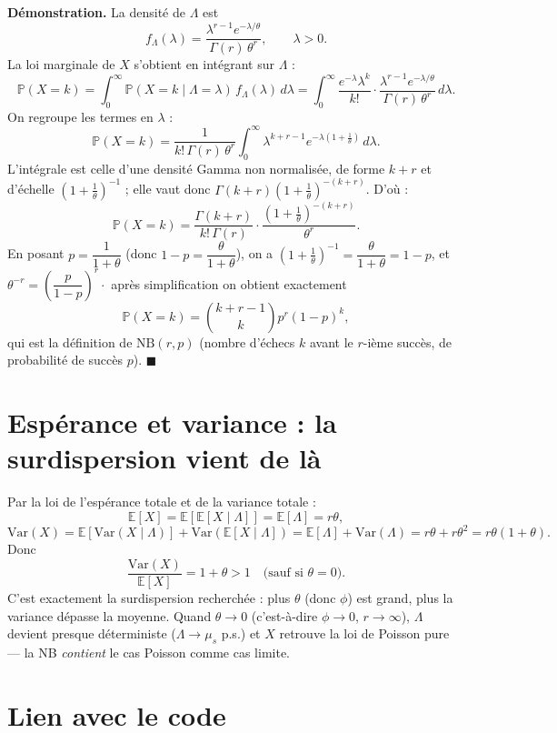 \documentclass[11pt]{article}
\begin{document}
\textbf{Démonstration.} La densité de $\Lambda$ est
\[
  f_\Lambda(\lambda) = \frac{\lambda^{r-1} e^{-\lambda/\theta}}{\Gamma(r)\,\theta^r}, \qquad \lambda > 0.
\]
La loi marginale de $X$ s'obtient en intégrant sur $\Lambda$ :
\[
  \mathbb{P}(X=k) = \int_0^\infty \mathbb{P}(X=k \mid \Lambda=\lambda)\, f_\Lambda(\lambda)\, d\lambda
  = \int_0^\infty \frac{e^{-\lambda}\lambda^k}{k!} \cdot \frac{\lambda^{r-1} e^{-\lambda/\theta}}{\Gamma(r)\,\theta^r}\, d\lambda .
\]
On regroupe les termes en $\lambda$ :
\[
  \mathbb{P}(X=k) = \frac{1}{k!\,\Gamma(r)\,\theta^r} \int_0^\infty \lambda^{k+r-1} e^{-\lambda\left(1+\frac{1}{\theta}\right)}\, d\lambda .
\]
L'intégrale est celle d'une densité Gamma non normalisée, de forme $k+r$ et d'échelle
$\left(1+\tfrac{1}{\theta}\right)^{-1}$ ; elle vaut donc
$\Gamma(k+r)\left(1+\tfrac{1}{\theta}\right)^{-(k+r)}$. D'où :
\[
  \mathbb{P}(X=k) = \frac{\Gamma(k+r)}{k!\,\Gamma(r)} \cdot \frac{\left(1+\frac{1}{\theta}\right)^{-(k+r)}}{\theta^r}.
\]
En posant $p = \dfrac{1}{1+\theta}$ (donc $1-p = \dfrac{\theta}{1+\theta}$), on a
$\left(1+\tfrac1\theta\right)^{-1} = \dfrac{\theta}{1+\theta} = 1-p$, et $\theta^{-r} = \left(\dfrac{p}{1-p}\right)^r \cdot$ après simplification on obtient exactement
\[
  \mathbb{P}(X=k) = \binom{k+r-1}{k} p^r (1-p)^k,
\]
qui est la définition de $\mathrm{NB}(r,p)$ (nombre d'échecs $k$ avant le $r$-ième succès, de
probabilité de succès $p$). $\blacksquare$

\section{Espérance et variance : la surdispersion vient de là}

Par la loi de l'espérance totale et de la variance totale :
\[
  \mathbb{E}[X] = \mathbb{E}[\mathbb{E}[X\mid\Lambda]] = \mathbb{E}[\Lambda] = r\theta,
\]
\[
  \mathrm{Var}(X) = \mathbb{E}[\mathrm{Var}(X\mid\Lambda)] + \mathrm{Var}(\mathbb{E}[X\mid\Lambda])
  = \mathbb{E}[\Lambda] + \mathrm{Var}(\Lambda) = r\theta + r\theta^2 = r\theta(1+\theta).
\]
Donc
\[
  \frac{\mathrm{Var}(X)}{\mathbb{E}[X]} = 1+\theta > 1 \quad \text{(sauf si } \theta=0\text{)}.
\]
C'est exactement la surdispersion recherchée : plus $\theta$ (donc $\phi$) est grand, plus la
variance dépasse la moyenne. Quand $\theta \to 0$ (c'est-à-dire $\phi \to 0$, $r \to \infty$),
$\Lambda$ devient presque déterministe ($\Lambda \to \mu_s$ p.s.) et $X$ retrouve la loi de
Poisson pure — la NB \emph{contient} le cas Poisson comme cas limite.

\section{Lien avec le code}
\end{document}
